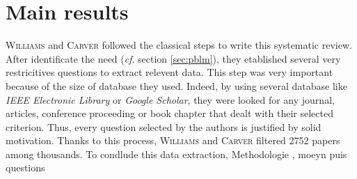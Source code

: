\documentclass[12pt]{article}
\newcommand{\cf}{\emph{cf}.}
\begin{document}


\section{Main results}\label{sec:res}
\textsc{Williams} and \textsc{Carver} followed the classical steps to write this systematic review. After identificate the need (\cf{} section \ref{sec:pblm}), they etablished several very restricitives questions  to extract relevent data. This step was very important because of the size of database they used. Indeed, by using several database like \textit{IEEE Electronic Library} or \textit{Google Scholar}, they were looked for any journal, articles, conference proceeding or book chapter that dealt with their selected criterion. Thus, every question selected by the authors is justified by solid motivation. Thanks to this process, \textsc{Williams} and \textsc{Carver} filtered 2752 papers among thousands. To condlude this data extraction, 
Methodologie , moeyn puis questions
\end{document}
